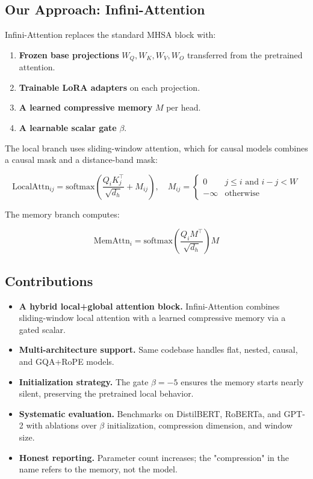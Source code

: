 \subsection{Our Approach: Infini-Attention}

Infini-Attention replaces the standard MHSA block with:

\begin{enumerate}
\item \textbf{Frozen base projections} $W_Q, W_K, W_V, W_O$ transferred from the
  pretrained attention.
\item \textbf{Trainable LoRA adapters} on each projection.
\item \textbf{A learned compressive memory} $M$ per head.
\item \textbf{A learnable scalar gate} $\beta$.

\end{enumerate}
The local branch uses sliding-window attention, which for causal models 
combines a causal mask and a distance-band mask:

\[
\text{LocalAttn}_{ij} = \text{softmax}\!\left(\frac{Q_i K_j^\top}{\sqrt{d_h}} + M_{ij}\right), \quad
M_{ij} = \begin{cases} 0 & j \leq i \text{ and } i - j < W \\ -\infty & \text{otherwise} \end{cases}
\tag{1.2}
\]

The memory branch computes:

\[
\text{MemAttn}_i = \text{softmax}\!\left(\frac{Q_i M^\top}{\sqrt{d_h}}\right) M
\tag{1.3}
\]

\subsection{Contributions}

\begin{itemize}
\item \textbf{A hybrid local+global attention block.} Infini-Attention combines
  sliding-window local attention with a learned compressive memory via a
  gated scalar.
\item \textbf{Multi-architecture support.} Same codebase handles flat, nested,
  causal, and GQA+RoPE models.
\item \textbf{Initialization strategy.} The gate $\beta = -5$ ensures the memory
  starts nearly silent, preserving the pretrained local behavior.
\item \textbf{Systematic evaluation.} Benchmarks on DistilBERT, RoBERTa, and GPT-2
  with ablations over $\beta$ initialization, compression dimension, and
  window size.
\item \textbf{Honest reporting.} Parameter count increases; the "compression" in the
  name refers to the memory, not the model.

\end{itemize}
